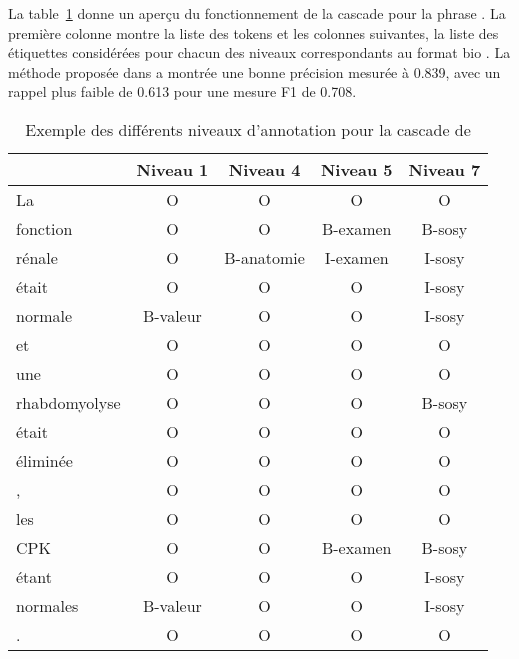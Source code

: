 La table~\ref{tab:tal:cascade} donne un aperçu du fonctionnement de la cascade pour la phrase .
La première colonne montre la liste des tokens et les colonnes suivantes, la liste des étiquettes considérées pour chacun des niveaux correspondants au format \gls{bio} \cite{ramshawTextChunkingUsing1995}.
La méthode proposée dans \cite{minardDOINGDEFTCascade2020} a montrée une bonne précision mesurée à \num{0.839}, avec un rappel plus faible de \num{0.613} pour une mesure F1 de \num{0.708}.

\begin{table}[htb]
    \centering
    \begin{tabular}{l|cccc}
                      & Niveau 1 & Niveau 4   & Niveau 5 & Niveau 7 \\
        \hline
        \hline
        La            & O        & O          & O        & O        \\
        fonction      & O        & O          & B-examen & B-sosy   \\
        rénale        & O        & B-anatomie & I-examen & I-sosy   \\
        était         & O        & O          & O        & I-sosy   \\
        normale       & B-valeur & O          & O        & I-sosy   \\
        et            & O        & O          & O        & O        \\
        une           & O        & O          & O        & O        \\
        rhabdomyolyse & O        & O          & O        & B-sosy   \\
        était         & O        & O          & O        & O        \\
        éliminée      & O        & O          & O        & O        \\
        ,             & O        & O          & O        & O        \\
        les           & O        & O          & O        & O        \\
        CPK           & O        & O          & B-examen & B-sosy   \\
        étant         & O        & O          & O        & I-sosy   \\
        normales      & B-valeur & O          & O        & I-sosy   \\
        .             & O        & O          & O        & O
    \end{tabular}
    \caption{Exemple des différents niveaux d'annotation pour la cascade de }
    \label{tab:tal:cascade}
\end{table}

